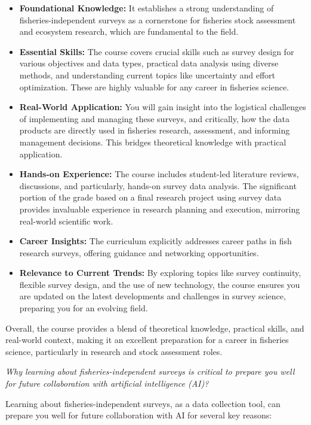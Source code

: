 \documentclass[
  letterpaper,
  oneside,
  open=any]{scrbook}
\providecommand{\tightlist}{%
  \setlength{\itemsep}{0pt}\setlength{\parskip}{0pt}}\usepackage{longtable,booktabs,array}
\begin{document}
\begin{itemize}
\tightlist
\item
  \textbf{Foundational Knowledge:} It establishes a strong understanding
  of fisheries-independent surveys as a cornerstone for fisheries stock
  assessment and ecosystem research, which are fundamental to the field.
\item
  \textbf{Essential Skills:} The course covers crucial skills such as
  survey design for various objectives and data types, practical data
  analysis using diverse methods, and understanding current topics like
  uncertainty and effort optimization. These are highly valuable for any
  career in fisheries science.
\item
  \textbf{Real-World Application:} You will gain insight into the
  logistical challenges of implementing and managing these surveys, and
  critically, how the data products are directly used in fisheries
  research, assessment, and informing management decisions. This bridges
  theoretical knowledge with practical application.
\item
  \textbf{Hands-on Experience:} The course includes student-led
  literature reviews, discussions, and particularly, hands-on survey
  data analysis. The significant portion of the grade based on a final
  research project using survey data provides invaluable experience in
  research planning and execution, mirroring real-world scientific work.
\item
  \textbf{Career Insights:} The curriculum explicitly addresses career
  paths in fish research surveys, offering guidance and networking
  opportunities.
\item
  \textbf{Relevance to Current Trends:} By exploring topics like survey
  continuity, flexible survey design, and the use of new technology, the
  course ensures you are updated on the latest developments and
  challenges in survey science, preparing you for an evolving field.
\end{itemize}

Overall, the course provides a blend of theoretical knowledge, practical
skills, and real-world context, making it an excellent preparation for a
career in fisheries science, particularly in research and stock
assessment roles.

\emph{Why learning about fisheries-independent surveys is critical to
prepare you well for future collaboration with artificial intelligence
(AI)?}

Learning about fisheries-independent surveys, as a data collection tool,
can prepare you well for future collaboration with AI for several key
reasons:
\end{document}
